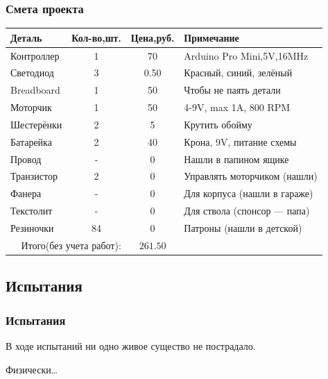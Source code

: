 \begin{frame}
    \frametitle{Смета проекта \myDevice}
    
    \begin{center}
        \begin{tabular}{l|c|c|l}
            \hline\hline
            Деталь & Кол-во,шт. & Цена,руб. & Примечание \\
            \hline\hline
            Контроллер & 1  & 70   & Arduino Pro Mini,5V,16MHz\\
            Светодиод  & 3  & 0.50 & Красный, синий, зелёный\\
            Breadboard & 1  & 50   & Чтобы не паять детали\\
            Моторчик   & 1  & 50   & 4-9V, max 1A, 800 RPM\\
            Шестерёнки & 2  & 5    & Крутить обойму\\
            Батарейка  & 2  & 40   & Крона, 9V, питание схемы\\
            Провод     & -  & 0    & Нашли в папином ящике\\
            Транзистор & 2  & 0    & Управлять моторчиком (нашли)\\
            Фанера     & -  & 0    & Для корпуса (нашли в гараже)\\
            Текстолит  & -  & 0    & Для ствола (спонсор --- папа)\\
            Резиночки  & 84 & 0    & Патроны (нашли в детской)\\ \hline
            \multicolumn{2}{r|}{Итого(\alert{без учета работ}):} & \multicolumn{1}{c}{\alert{$261.50$}} & \\
        \end{tabular}
    \end{center}
\end{frame}


\subsection{Испытания \myDevice}

\begin{frame}
    \frametitle{Испытания \myDevice}
    \begin{center}
        В ходе испытаний ни одно живое существо не пострадало.

        Физически\ldots    
    \end{center}    
\end{frame}

